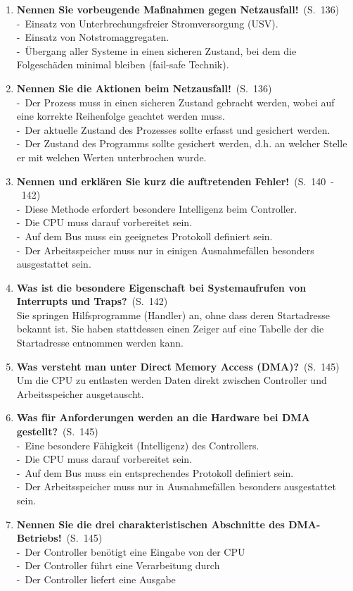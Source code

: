 \documentclass[a4paper,12pt]{article}
\newcommand{\question}[3]{\pagebreak[3]\item {\textbf{#1?}}\ (S.\ #2)#3}
\newcommand{\statement}[3]{\pagebreak[3]\item {\textbf{#1!}}\ (S.\ #2)#3}
\newcommand{\catchword}[1]{\\-\ #1}
\newcommand{\normaltext}[1]{\\#1}
\newcommand{\page}[1]{#1}
\newcommand{\pages}[2]{#1\ -\ #2}
\begin{document}
\begin{enumerate}
  \statement{Nennen Sie vorbeugende Maßnahmen gegen Netzausfall}{\page{136}}
  {
    \catchword{Einsatz von Unterbrechungsfreier Stromversorgung (USV).}
    \catchword{Einsatz von Notstromaggregaten.}
    \catchword{Übergang aller Systeme in einen sicheren Zustand, bei dem die Folgeschäden minimal
               bleiben (fail-safe Technik).}
  }

  \statement{Nennen Sie die Aktionen beim Netzausfall}{\page{136}}
  {
    \catchword{Der Prozess muss in einen sicheren Zustand gebracht werden, wobei auf eine korrekte
               Reihenfolge geachtet werden muss.}
    \catchword{Der aktuelle Zustand des Prozesses sollte erfasst und gesichert werden.}
    \catchword{Der Zustand des Programms sollte gesichert werden, d.h. an welcher Stelle er mit
               welchen Werten unterbrochen wurde.}
  }

  \statement{Nennen und erklären Sie kurz die auftretenden Fehler}{\pages{140}{142}}
  {
    \catchword{Diese Methode erfordert besondere Intelligenz beim Controller.}
    \catchword{Die CPU muss darauf vorbereitet sein.}
    \catchword{Auf dem Bus muss ein geeignetes Protokoll definiert sein.}
    \catchword{Der Arbeitsspeicher muss nur in einigen Ausnahmefällen besonders ausgestattet sein.}
  }

  \question{Was ist die besondere Eigenschaft bei Systemaufrufen von Interrupts und Traps}{\page{142}}
  {
    \normaltext{Sie springen Hilfsprogramme (Handler) an, ohne dass deren Startadresse bekannt ist.
                Sie haben stattdessen einen Zeiger auf eine Tabelle der die Startadresse
                entnommen werden kann.}
  }

  \question{Was versteht man unter Direct Memory Access (DMA)}{\page{145}}
  {
    \normaltext{Um die CPU zu entlasten werden Daten direkt zwischen Controller und Arbeitsspeicher
                ausgetauscht.}
  }

  \question{Was für Anforderungen werden an die Hardware bei DMA gestellt}{\page{145}}
  {
    \catchword{Eine besondere Fähigkeit (Intelligenz) des Controllers.}
    \catchword{Die CPU muss darauf vorbereitet sein.}
    \catchword{Auf dem Bus muss ein entsprechendes Protokoll definiert sein.}
    \catchword{Der Arbeitsspeicher muss nur in Ausnahmefällen besonders ausgestattet sein.}
  }

  \statement{Nennen Sie die drei charakteristischen Abschnitte des DMA-Betriebs}{\page{145}}
  {
    \catchword{Der Controller benötigt eine Eingabe von der CPU}
    \catchword{Der Controller führt eine Verarbeitung durch}
    \catchword{Der Controller liefert eine Ausgabe}
  }


\end{enumerate}
\end{document}
